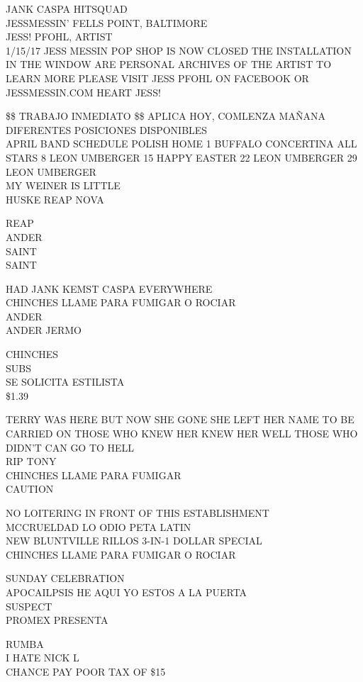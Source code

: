 \documentclass[10pt,letterpaper]{article}
\begin{document}
JANK CASPA HITSQUAD\\
JESSMESSIN' FELLS POINT, BALTIMORE\\
JESS! PFOHL, ARTIST\\
1/15/17 JESS MESSIN POP SHOP IS NOW CLOSED THE INSTALLATION IN THE WINDOW ARE PERSONAL ARCHIVES OF THE ARTIST TO LEARN MORE PLEASE VISIT JESS PFOHL ON FACEBOOK OR JESSMESSIN.COM HEART JESS!

\$\$ TRABAJO INMEDIATO \$\$ APLICA HOY, COMLENZA MAÑANA DIFERENTES POSICIONES DISPONIBLES\\
APRIL BAND SCHEDULE POLISH HOME 1 BUFFALO CONCERTINA ALL STARS 8 LEON UMBERGER 15 HAPPY EASTER 22 LEON UMBERGER 29 LEON UMBERGER\\
MY WEINER IS LITTLE\\
HUSKE REAP NOVA

REAP\\
ANDER\\
SAINT\\
SAINT

HAD JANK KEMST CASPA EVERYWHERE\\
CHINCHES LLAME PARA FUMIGAR O ROCIAR\\
ANDER\\
ANDER JERMO

CHINCHES\\
SUBS\\
SE SOLICITA ESTILISTA\\
\$1.39

TERRY WAS HERE BUT NOW SHE GONE SHE LEFT HER NAME TO BE CARRIED ON THOSE WHO KNEW HER KNEW HER WELL THOSE WHO DIDN'T CAN GO TO HELL\\
RIP TONY\\
CHINCHES LLAME PARA FUMIGAR\\
CAUTION

NO LOITERING IN FRONT OF THIS ESTABLISHMENT\\
MCCRUELDAD LO ODIO PETA LATIN\\
NEW BLUNTVILLE RILLOS 3{-}IN{-}1 DOLLAR SPECIAL\\
CHINCHES LLAME PARA FUMIGAR O ROCIAR

SUNDAY CELEBRATION\\
APOCAILPSIS HE AQUI YO ESTOS A LA PUERTA\\
SUSPECT\\
PROMEX PRESENTA

RUMBA\\
I HATE NICK L\\
CHANCE PAY POOR TAX OF \$15
\end{document}
